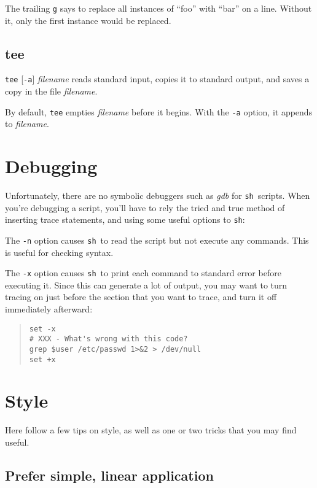 \documentclass{article}
\newcommand{\fname}[1]{\textsl{#1}}
\newcommand{\code}[1]{\texttt{#1}}
\newcommand{\sh}{\code{sh}}
\begin{document}
	The trailing \code{g} says to replace all instances of ``foo''
with ``bar'' on a line. Without it, only the first instance would be
replaced.

\subsection{tee}

	\code{tee} [\code{-a}] \textit{filename} reads standard input,
copies it to standard output, and saves a copy in the file
\textit{filename}.

	By default, \code{tee} empties \textit{filename} before it
begins. With the \code{-a} option, it appends to \textit{filename}.

\section{Debugging}

	Unfortunately, there are no symbolic debuggers such as
\fname{gdb} for \sh\ scripts. When you're debugging a script, you'll
have to rely the tried and true method of inserting trace statements,
and using some useful options to \sh:

	The \code{-n} option causes \sh\ to read the script but not
execute any commands. This is useful for checking syntax.

	The \code{-x} option causes \sh\ to print each command to
standard error before executing it. Since this can generate a lot of
output, you may want to turn tracing on just before the section that
you want to trace, and turn it off immediately afterward:
\begin{quote}
\begin{verbatim}
set -x
# XXX - What's wrong with this code?
grep $user /etc/passwd 1>&2 > /dev/null
set +x
\end{verbatim}%
\end{quote}

\section{Style}

	Here follow a few tips on style, as well as one or two tricks
that you may find useful.

\subsection{Prefer simple, linear application}
\end{document}
